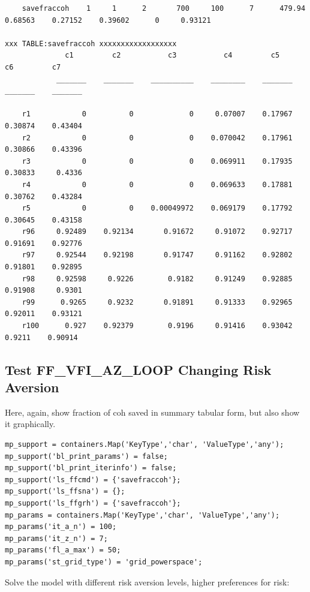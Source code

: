 \documentclass[
]{book}
\begin{document}
\begin{verbatim}
    savefraccoh    1     1      2       700     100      7      479.94    0.68563    0.27152    0.39602      0     0.93121

xxx TABLE:savefraccoh xxxxxxxxxxxxxxxxxx
              c1         c2           c3           c4         c5         c6         c7   
            _______    _______    __________    ________    _______    _______    _______

    r1            0          0             0     0.07007    0.17967    0.30874    0.43404
    r2            0          0             0    0.070042    0.17961    0.30866    0.43396
    r3            0          0             0    0.069911    0.17935    0.30833     0.4336
    r4            0          0             0    0.069633    0.17881    0.30762    0.43284
    r5            0          0    0.00049972    0.069179    0.17792    0.30645    0.43158
    r96     0.92489    0.92134       0.91672     0.91072    0.92717    0.91691    0.92776
    r97     0.92544    0.92198       0.91747     0.91162    0.92802    0.91801    0.92895
    r98     0.92598     0.9226        0.9182     0.91249    0.92885    0.91908     0.9301
    r99      0.9265     0.9232       0.91891     0.91333    0.92965    0.92011    0.93121
    r100      0.927    0.92379        0.9196     0.91416    0.93042     0.9211    0.90914
\end{verbatim}

\hypertarget{test-ff_vfi_az_loop-changing-risk-aversion}{%
\subsection{Test FF\_VFI\_AZ\_LOOP Changing Risk Aversion}\label{test-ff_vfi_az_loop-changing-risk-aversion}}

Here, again, show fraction of coh saved in summary tabular form, but
also show it graphically.

\begin{verbatim}
mp_support = containers.Map('KeyType','char', 'ValueType','any');
mp_support('bl_print_params') = false;
mp_support('bl_print_iterinfo') = false;
mp_support('ls_ffcmd') = {'savefraccoh'};
mp_support('ls_ffsna') = {};
mp_support('ls_ffgrh') = {'savefraccoh'};
mp_params = containers.Map('KeyType','char', 'ValueType','any');
mp_params('it_a_n') = 100;
mp_params('it_z_n') = 7;
mp_params('fl_a_max') = 50;
mp_params('st_grid_type') = 'grid_powerspace';
\end{verbatim}

Solve the model with different risk aversion levels, higher preferences
for risk:
\end{document}
